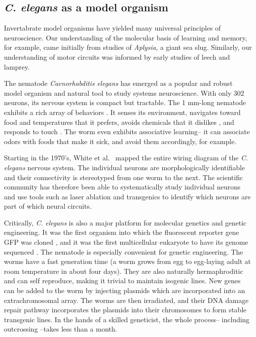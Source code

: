 

\subsection{\textit{C. elegans} as a model organism}
Invertabrate model organisms have yielded many universal principles of neuroscience.  Our understanding of the molecular basis of learning and memory, for example, came initially from studies of \textit{Aplysia}, a giant sea slug.  Similarly, our understanding of motor circuits was informed by early studies of leech and lamprey. 

The nematode \textit{Caenorhabditis elegans} has emerged as a popular and robust model organism and natural tool to study systems neuroscience. With only 302 neurons, its nervous system is compact but tractable. The 1 mm-long nematode exhibits a rich array of behaviors \citep{croll_components_1975}. It senses its environment,  navigates toward food \cite{grewal_migration_1992}  and temperatures \cite{ryu_thermotaxis_2002} that it prefers,  avoids chemicals that it dislikes \citep{croll_behavoural_1975}, and responds to touch \citep{chalfie_neural_1985}. The worm even exhibits associative learning-- it can associate odors with foods that make it sick, and avoid them accordingly, for example\citep{zhang_pathogenic_2005}. 

Starting in the 1970's, White et al.~\citep{white_structure_1976, white_structure_1986}  mapped the entire wiring diagram of the \textit{C. elegans} nervous system. The individual neurons are morphologically identifiable and their connectivity is stereotyped from one worm to the next. The  scientific community has therefore been able to systematically study individual neurons and use tools such as laser ablation and transgenics to identify which neurons are part of which neural circuits. 

Critically, \textit{C. elegans} is also a major platform for molecular genetics and genetic engineering. It was the first organism into which the fluorescent reporter gene GFP was cloned \citep{chalfie_green_1994},  and it was the first multicellular eukaryote to have its genome sequenced \citep{sulston_c._1992,_genome_1998}. The nematode is especially convenient for genetic engineering. The worms have a fast generation time (a worm grows from egg to egg-laying adult at room temperature in about four days).  They are also naturally hermaphroditic and can self reproduce,  making it trivial to maintain isogenic lines. New genes can be added to the worm by injecting plasmids which are incorporated into an extrachromosomal array. The worms are then irradiated, and their DNA damage repair pathway incorporates the plasmids into their chromosomes to form stable transgenic lines.  In the hands of a skilled geneticist, the whole process-- including outcrossing --takes less than a month. 

